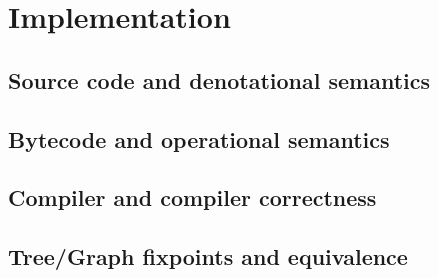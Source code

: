 \section{Implementation}

    \subsection{Source code and denotational semantics}


    \subsection{Bytecode and operational semantics}


    \subsection{Compiler and compiler correctness}


    \subsection{Tree/Graph fixpoints and equivalence}



